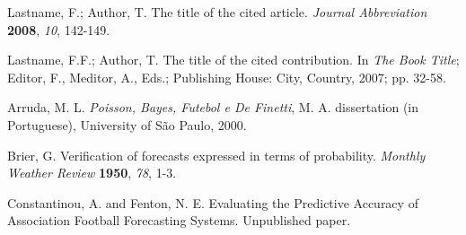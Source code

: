\documentclass[journal,article,accept,moreauthors,pdftex,12pt,a4paper]{mdpi}
\begin{document}
\begin{thebibliography}{999} %

Lastname, F.; Author, T. The title of the cited article. {\em Journal Abbreviation} {\bf 2008}, {\em 10}, 142-149.

Lastname, F.F.; Author, T. The title of the cited contribution. In {\em The Book Title}; Editor, F., Meditor, A., Eds.; Publishing House: City, Country, 2007; pp. 32-58.


Arruda, M. L. {\em Poisson, Bayes, Futebol e De Finetti}, M. A. dissertation (in Portuguese), University of S\~ao Paulo, 2000.

Brier, G. Verification of forecasts expressed in terms of probability. {\em Monthly Weather Review} {\bf 1950}, {\em 78}, 1-3.

Constantinou, A. and Fenton, N. E. Evaluating the Predictive Accuracy of Association Football Forecasting Systems. Unpublished paper.


\end{thebibliography}

%
%


%


%
\end{document}
